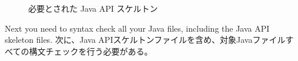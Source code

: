 \documentclass[\pformat,12pt]{jarticle}
\begin{document}
\begin{figure}[tbh]
\begin{center}
\caption{必要とされた Java API スケルトン}\label{fig:javaLibFiles}
\end{center}
\end{figure}

Next you need to syntax check all your Java files, including the Java
API skeleton files. 
次に、Java APIスケルトンファイルを含め、対象Javaファイルすべての構文チェックを行う必要がある。
\end{document}
